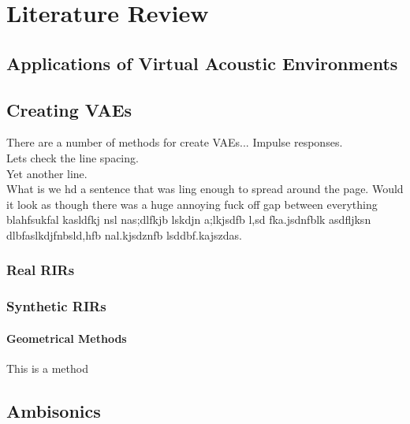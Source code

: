 \documentclass[../../main.tex]{subfiles}
\begin{document}
\section{Literature Review}

\subsection{Applications of Virtual Acoustic Environments}

\subsection{Creating VAEs}
There are a number of methods for create VAEs... Impulse responses.\\
Lets check the line spacing.\\
Yet another line.\\

What is we hd a sentence that was ling enough to spread around the page. Would it look as though there was a huge annoying fuck off gap between everything blahfsukfal kasldfkj nsl nas;dlfkjb lskdjn a;lkjsdfb l,sd fka.jsdnfblk asdfljksn dlbfaslkdjfnbsld,hfb nal.kjsdznfb lsddbf.kajszdas.\\
\subsubsection{Real RIRs}

\subsubsection{Synthetic RIRs}

\paragraph{Geometrical Methods}

This is a method

\subsection{Ambisonics}
\end{document}
